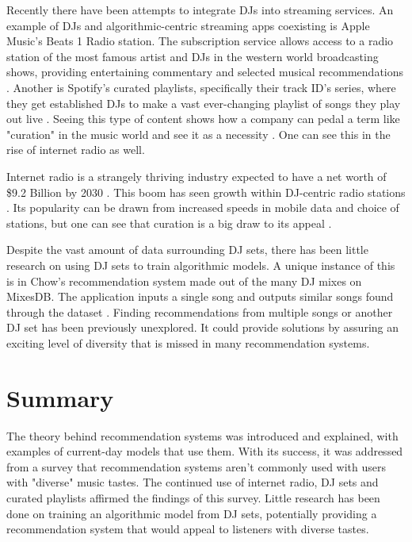 Recently there have been attempts to integrate DJs into streaming services. An example of DJs and algorithmic-centric streaming apps coexisting is Apple Music's Beats 1 Radio station. The subscription service allows access to a radio station of the most famous artist and DJs in the western world broadcasting shows, providing entertaining commentary and selected musical recommendations \citep{dms_apple_2020}. Another is Spotify's curated playlists, specifically their track ID's series, where they get established DJs to make a vast ever-changing playlist of songs they play out live \citep{spotify_introducing_2020}. Seeing this type of content shows how a company can pedal a term like "curation" in the music world and see it as a necessity \citep{barna_perfect_2017}. One can see this in the rise of internet radio as well.  

Internet radio is a strangely thriving industry expected to have a net worth of \$9.2 Billion by 2030 \citep{market_research_future_internet_2022}. This boom has seen growth within DJ-centric radio stations \citep{gillett_how_2021}. Its popularity can be drawn from increased speeds in mobile data and choice of stations, but one can see that curation is a big draw to its appeal \citep{nts_2023}.

Despite the vast amount of data surrounding DJ sets, there has been little research on using DJ sets to train algorithmic models. A unique instance of this is in Chow's recommendation system made out of the many DJ mixes on MixesDB. The application inputs a single song and outputs similar songs found through the dataset \citep{chow_music_2020}. Finding recommendations from multiple songs or another DJ set has been previously unexplored. It could provide solutions by assuring an exciting level of diversity that is missed in many recommendation systems.


\section{Summary}
The theory behind recommendation systems was introduced and explained, with examples of current-day models that use them. With its success, it was addressed from a survey that recommendation systems aren't commonly used with users with "diverse" music tastes. The continued use of internet radio, DJ sets and curated playlists affirmed the findings of this survey. Little research has been done on training an algorithmic model from DJ sets, potentially providing a recommendation system that would appeal to listeners with diverse tastes. 

